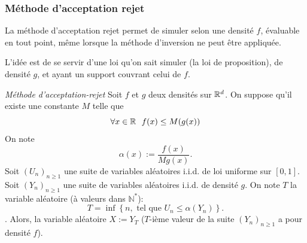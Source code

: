 \subsubsection{Méthode d'acceptation rejet}

La méthode d'acceptation rejet permet de simuler selon une densité $f$, évaluable en tout point, même lorsque la méthode d'inversion ne peut être appliquée.

L'idée est de se servir d'une loi qu'on sait simuler (la loi de proposition), de densité $g$, et ayant un support couvrant celui de $f$.

\begin{propriete}{\textit{Méthode d'acceptation-rejet}}\label{prop:meth:ar}
Soit $f$ et $g$ deux densités sur $\mathbb{R}^d$.
On suppose qu'il existe une constante $M$ telle que 
$$\forall x \in \mathbb{R}~~f(x) \leq M(g(x))$$
On note 
$$\alpha(x) := \frac{f(x)}{Mg(x)}.$$
Soit $(U_n)_{n\geq 1}$ une suite de variables aléatoires i.i.d. de loi uniforme sur $[0, 1]$. Soit $(Y_n)_{n\geq 1}$ une suite de variables aléatoires i.i.d. de densité $g$.
On note $T$ la variable aléatoire (à valeurs dans $\mathbb{N}^*$):
$$T = \inf\left\lbrace n, \text{ tel que } U_n \leq \alpha(Y_n)\right\rbrace.$$.
Alors, la variable aléatoire $X := Y_T$ ($T$-ième valeur de la suite  $(Y_n)_{n\geq 1}$ a pour densité $f$).
\end{propriete}


